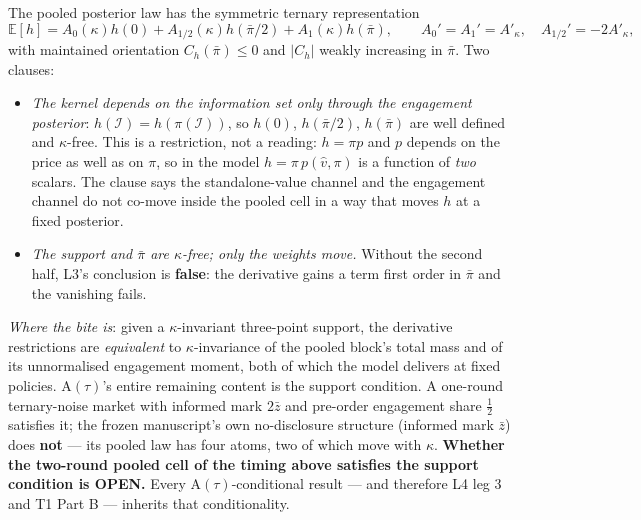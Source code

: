 \documentclass[11pt,a4paper]{article}
\newcommand{\Eop}{\mathbb{E}}
\newcommand{\Atau}{\mathrm{A}(\tau)}
\newcommand{\Akap}{A'_{\kappa}}
\begin{document}
\begin{description}[leftmargin=1.9em,style=unboxed]
\item[$\Atau$ Threshold chord restriction.] The pooled posterior law has the
  symmetric ternary representation
  \[
  \Eop[h]=A_0(\kappa)h(0)+A_{1/2}(\kappa)h(\bar\pi/2)+A_1(\kappa)h(\bar\pi),
  \qquad A_0'=A_1'=\Akap,\quad A_{1/2}'=-2\Akap,
  \]
  with maintained orientation $C_h(\bar\pi)\le0$ and $|C_h|$ weakly increasing in
  $\bar\pi$. Two clauses:
  \begin{itemize}
  \item[($\tau$-i)] \emph{The kernel depends on the information set only through the
    engagement posterior}: $h(\mathcal I)=h(\pi(\mathcal I))$, so $h(0)$,
    $h(\bar\pi/2)$, $h(\bar\pi)$ are well defined and $\kappa$-free. This is a
    restriction, not a reading: $h=\pi p$ and $p$ depends on the price as well as on
    $\pi$, so in the model $h=\pi\,p(\hat v,\pi)$ is a function of \emph{two}
    scalars. The clause says the standalone-value channel and the engagement channel
    do not co-move inside the pooled cell in a way that moves $h$ at a fixed
    posterior.
  \item[($\tau$-ii)] \emph{The support and $\bar\pi$ are $\kappa$-free; only the
    weights move.} Without the second half, L3's conclusion is \textbf{false}: the
    derivative gains a term first order in $\bar\pi$ and the vanishing fails.
  \end{itemize}
  \emph{Where the bite is}: given a $\kappa$-invariant three-point support, the
  derivative restrictions are \emph{equivalent} to $\kappa$-invariance of the pooled
  block's total mass and of its unnormalised engagement moment, both of which the
  model delivers at fixed policies. $\Atau$'s entire remaining content is the
  support condition. A one-round ternary-noise market with informed mark $2\bar z$
  and pre-order engagement share $\tfrac12$ satisfies it; the frozen manuscript's own
  no-disclosure structure (informed mark $\bar z$) does \textbf{not} --- its pooled
  law has four atoms, two of which move with $\kappa$. \textbf{Whether the two-round
  pooled cell of the timing above satisfies the support condition is OPEN.} Every
  $\Atau$-conditional result --- and therefore L4 leg 3 and T1 Part B --- inherits
  that conditionality.


\end{description}
\end{document}
